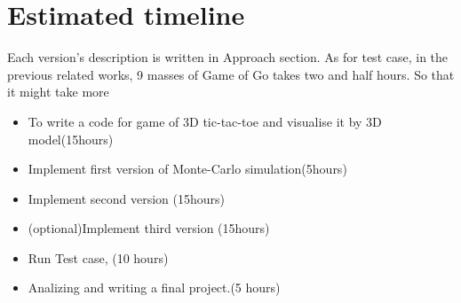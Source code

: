 \documentclass[11pt]{article}
\begin{document}
\section{Estimated timeline}
Each version's description is written in Approach section. As for test case, in the previous related works, 9 masses of Game of Go takes two and half hours. So that it might take more 
\begin{itemize} 
\item To write a code for game of 3D tic-tac-toe and visualise it by 3D model(15hours)
\item Implement first version of Monte-Carlo simulation(5hours)
\item Implement second version (15hours)
\item (optional)Implement third version (15hours)
\item Run Test case, (10 hours)
\item Analizing and writing a final project.(5 hours) 
\end{itemize}








\end{document}
